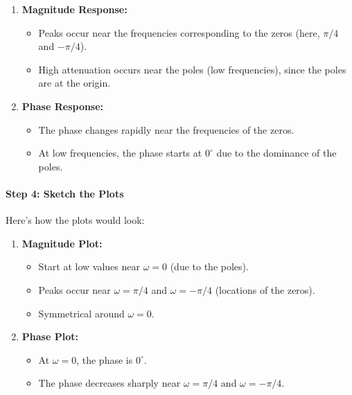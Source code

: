 \documentclass[11pt]{article}
\providecommand{\tightlist}{%
      \setlength{\itemsep}{0pt}\setlength{\parskip}{0pt}}
\begin{document}
\begin{enumerate}
\def\labelenumi{\arabic{enumi}.}
\tightlist
\item
  \textbf{Magnitude Response:}

  \begin{itemize}
  \tightlist
  \item
    Peaks occur near the frequencies corresponding to the zeros (here,
    \(\pi/4\) and \(-\pi/4\)).
  \item
    High attenuation occurs near the poles (low frequencies), since the
    poles are at the origin.
  \end{itemize}
\item
  \textbf{Phase Response:}

  \begin{itemize}
  \tightlist
  \item
    The phase changes rapidly near the frequencies of the zeros.
  \item
    At low frequencies, the phase starts at \(0^\circ\) due to the
    dominance of the poles.
  \end{itemize}
\end{enumerate}

\paragraph{Step 4: Sketch the Plots}\label{step-4-sketch-the-plots}

Here's how the plots would look:

\begin{enumerate}
\def\labelenumi{\arabic{enumi}.}
\tightlist
\item
  \textbf{Magnitude Plot:}

  \begin{itemize}
  \tightlist
  \item
    Start at low values near \(\omega = 0\) (due to the poles).
  \item
    Peaks occur near \(\omega = \pi/4\) and \(\omega = -\pi/4\)
    (locations of the zeros).
  \item
    Symmetrical around \(\omega = 0\).
  \end{itemize}
\item
  \textbf{Phase Plot:}

  \begin{itemize}
  \tightlist
  \item
    At \(\omega = 0\), the phase is \(0^\circ\).
  \item
    The phase decreases sharply near \(\omega = \pi/4\) and
    \(\omega = -\pi/4\).
  \end{itemize}
\end{enumerate}
\end{document}
